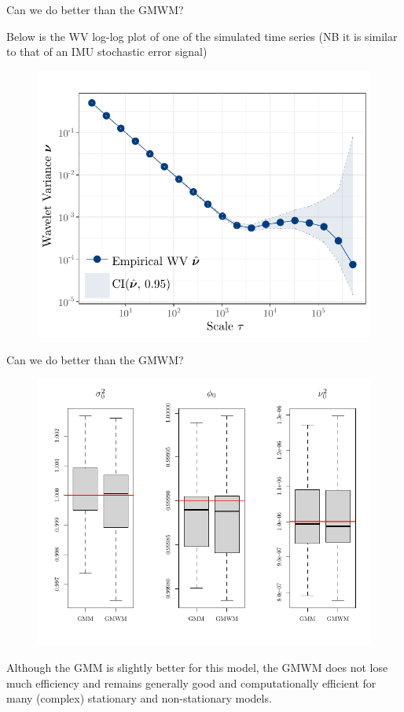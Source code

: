 \documentclass[envcountsect,usenames,dvipsnames]{beamer}
\theoremstyle{mystyle}
\begin{document}
\begin{frame}{Can we do better than the GMWM?}


Below is the WV log-log plot of one of the simulated time series (NB it is similar to that of an IMU stochastic error signal)

    \begin{figure}
    \centering
    \includegraphics[scale = 0.65]{Images/av_gmm.pdf}
\end{figure}
\end{frame}

\begin{frame}{Can we do better than the GMWM?}
\vspace{-0.4cm}
    \begin{figure}
    \centering
    \includegraphics[scale = 0.67]{Images/av_gmm2.pdf}
\end{figure}

\vspace{-0.6cm}
Although the GMM is slightly better for this model, the GMWM does not lose much efficiency and remains generally good and computationally efficient for many (complex) stationary and non-stationary models.

\end{frame}
\end{document}

